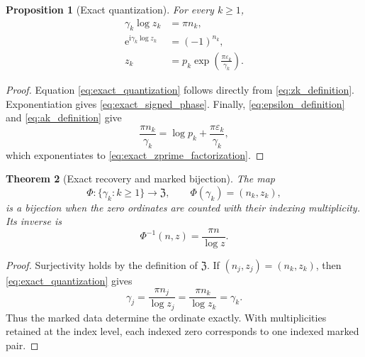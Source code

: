 \documentclass[11pt]{amsart}
\numberwithin{equation}{section}
\theoremstyle{plain}
\newtheorem{theorem}{Theorem}[section]
\newtheorem{proposition}[theorem]{Proposition}
\theoremstyle{definition}
\theoremstyle{remark}
\newcommand{\e}{\mathrm e}
\newcommand{\ii}{\mathrm i}
\newcommand{\ZP}{\mathfrak Z}
\begin{document}
\begin{proposition}[Exact quantization]
\label{prop:exact_quantization}
For every $k\geq1$,
\begin{align}
 \gamma_k\log z_k
 &=\pi n_k,
 \label{eq:exact_quantization}
 \\
 \e^{\ii\gamma_k\log z_k}
 &=(-1)^{n_k},
 \label{eq:exact_signed_phase}
 \\
 z_k
 &=p_k\exp\left(\frac{\pi\varepsilon_k}{\gamma_k}\right).
 \label{eq:exact_zprime_factorization}
\end{align}
\end{proposition}

\begin{proof}
Equation \eqref{eq:exact_quantization} follows directly from
\eqref{eq:zk_definition}.  Exponentiation gives
\eqref{eq:exact_signed_phase}.  Finally,
\eqref{eq:epsilon_definition} and \eqref{eq:ak_definition} give
\begin{equation}
 \frac{\pi n_k}{\gamma_k}
 =\log p_k+\frac{\pi\varepsilon_k}{\gamma_k},
 \label{eq:proof_log_factorization}
\end{equation}
which exponentiates to \eqref{eq:exact_zprime_factorization}.
\end{proof}

\begin{theorem}[Exact recovery and marked bijection]
\label{thm:exact_recovery_bijection}
The map
\begin{equation}
 \Phi:\{\gamma_k:k\geq1\}\longrightarrow\ZP,
 \qquad
 \Phi(\gamma_k)=(n_k,z_k),
 \label{eq:Phi_definition}
\end{equation}
is a bijection when the zero ordinates are counted with their indexing
multiplicity.  Its inverse is
\begin{equation}
 \Phi^{-1}(n,z)=\frac{\pi n}{\log z}.
 \label{eq:Phi_inverse}
\end{equation}
\end{theorem}

\begin{proof}
Surjectivity holds by the definition of $\ZP$.  If
$(n_j,z_j)=(n_k,z_k)$, then \eqref{eq:exact_quantization} gives
\begin{equation}
 \gamma_j
 =\frac{\pi n_j}{\log z_j}
 =\frac{\pi n_k}{\log z_k}
 =\gamma_k.
 \label{eq:bijection_injectivity_identity}
\end{equation}
Thus the marked data determine the ordinate exactly.  With multiplicities
retained at the index level, each indexed zero corresponds to one indexed
marked pair.
\end{proof}
\end{document}
